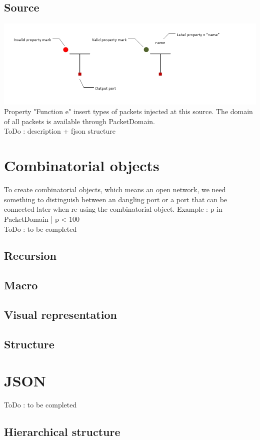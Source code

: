 \documentclass[a4paper,11pt,final]{article}
\begin{document}
\subsection{Source}
\includegraphics[width=1.0\textwidth]{source}
\\Property "Function e" insert types of packets injected at this source. The domain of all packets is available through PacketDomain. 
\\ToDo : description + fjson structure

\newpage
\section{Combinatorial objects}
To create combinatorial objects, which means an open network, we need something to distinguish between an dangling port or a port that can be connected later when re-using the combinatorial object. Example : {p in PacketDomain | p < 100}
\\ToDo : to be completed
\subsection{Recursion}
\subsection{Macro}
\subsection{Visual representation}
\subsection{Structure}

\newpage
\section{JSON}
ToDo : to be completed
\subsection{Hierarchical structure}
\end{document}
